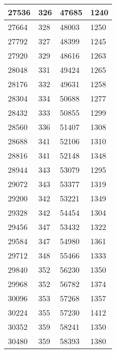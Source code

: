 \begin{longtable}{|l|l|l|l|}
		27536 & 326         & 47685           & 1240             \\ \hline
		27664 & 328         & 48003           & 1250             \\ \hline
		27792 & 327         & 48399           & 1245             \\ \hline
		27920 & 329         & 48616           & 1263             \\ \hline
		28048 & 331         & 49424           & 1265             \\ \hline
		28176 & 332         & 49631           & 1258             \\ \hline
		28304 & 334         & 50688           & 1277             \\ \hline
		28432 & 333         & 50855           & 1299             \\ \hline
		28560 & 336         & 51407           & 1308             \\ \hline
		28688 & 341         & 52106           & 1310             \\ \hline
		28816 & 341         & 52148           & 1348             \\ \hline
		28944 & 343         & 53079           & 1295             \\ \hline
		29072 & 343         & 53377           & 1319             \\ \hline
		29200 & 342         & 53221           & 1349             \\ \hline
		29328 & 342         & 54454           & 1304             \\ \hline
		29456 & 347         & 53432           & 1322             \\ \hline
		29584 & 347         & 54980           & 1361             \\ \hline
		29712 & 348         & 55466           & 1333             \\ \hline
		29840 & 352         & 56230           & 1350             \\ \hline
		29968 & 352         & 56782           & 1374             \\ \hline
		30096 & 353         & 57268           & 1357             \\ \hline
		30224 & 355         & 57230           & 1412             \\ \hline
		30352 & 359         & 58241           & 1350             \\ \hline
		30480 & 359         & 58393           & 1380             \\ \hline

\end{longtable}

